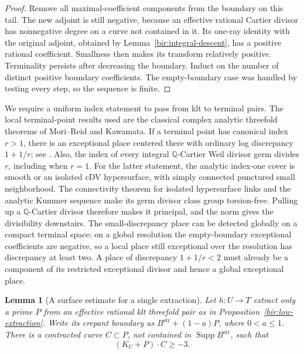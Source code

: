 \documentclass[11pt,letterpaper]{article}
\newtheorem{lemma}[theorem]{Lemma}
\theoremstyle{definition}
\theoremstyle{remark}
\begin{document}
\begin{proof}
Remove all maximal-coefficient components from the boundary on this
tail.  The new adjoint is still negative, because an effective
rational Cartier divisor has nonnegative degree on a curve not
contained in it.  Its one-ray identity with the original adjoint,
obtained by Lemma~\ref{bir:integral-descent}, has a positive rational
coefficient.  Smallness then makes its transform relatively positive.
Terminality persists after decreasing the boundary.  Induct on the
number of distinct positive boundary coefficients.  The empty-boundary
case was handled by testing every step, so the sequence is finite.
\end{proof}

We require a uniform index statement to pass from klt to terminal
pairs.  The local terminal-point results used are the classical
complex analytic threefold theorems of Mori--Reid and Kawamata.  If a
terminal point has canonical index $r>1$, there is an exceptional
place centered there with ordinary log discrepancy $1+1/r$; see
\cite{KawamataTerminalDiscrepancy}.  Also, the index of every integral
$\mathbb{Q}$-Cartier Weil divisor germ divides $r$, including when $r=1$.
For the latter statement, the analytic index-one cover is smooth or
an isolated cDV hypersurface, with simply connected punctured small
neighborhood.  The connectivity theorem for isolated hypersurface
links and the analytic Kummer sequence make its germ divisor class
group torsion-free.  Pulling up a $\mathbb{Q}$-Cartier divisor therefore makes
it principal, and the norm gives the divisibility downstairs.  The
small-discrepancy place can be detected globally on a compact
terminal space: on a global resolution the empty-boundary exceptional
coefficients are negative, so a local place still exceptional over
the resolution has discrepancy at least two.  A place of discrepancy
$1+1/r<2$ must already be a component of its restricted exceptional
divisor and hence a global exceptional place.

\begin{lemma}[A surface estimate for a single extraction]
\label{bir:surface-estimate}
Let $h:U\to T$ extract only a prime $P$ from an effective rational
klt threefold pair as in Proposition~\ref{bir:low-extraction}.  Write
its crepant boundary as $B^{\mathrm{str}}+(1-a)P$, where $0<a\leq1$.
There is a contracted curve $C\subset P$, not contained in
$\operatorname{Supp} B^{\mathrm{str}}$, such that
\begin{equation}
 (K_U+P)\cdot C\geq-3.
 \label{bir:surface-degree}
\end{equation}
\end{lemma}
\end{document}
